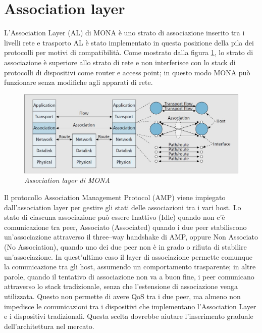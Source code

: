 \documentclass[12pt,a4paper,openright,twoside]{book}
\begin{document}
\section{Association layer}

L'Association Layer (AL) di MONA è uno strato di associazione inserito
tra i livelli rete e trasporto AL è stato implementato in questa
posizione della pila dei protocolli per motivi di compatibilità. Come
mostrato dalla figura \ref{fig:mona-association-layer}, lo strato di
associazione è superiore allo strato di rete e non interferisce con lo
stack di protocolli di dispositivi come router e access point; in
questo modo MONA può funzionare senza modifiche agli apparati di rete.

\begin{figure}[tb]
\centering
\includegraphics[width=\textwidth]{img/mona-association-layer}
\caption{\em Association layer di MONA}
\label{fig:mona-association-layer}
\end{figure}

Il protocollo Association Management Protocol (AMP) viene impiegato
dall'association layer per gestire gli stati delle associazioni tra i
vari host. Lo stato di ciascuna associazione può essere Inattivo
(Idle) quando non c'è comunicazione tra peer, Associato (Associated)
quando i due peer stabiliscono un'associazione attraverso il
three--way handshake di AMP, oppure Non Associato (No Association),
quando uno dei due peer non è in grado o rifiuta di stabilire
un'associazione. In quest'ultimo caso il layer di associazione
permette comunque la comunicazione tra gli host, assumendo un
comportamento trasparente; in altre parole, quando il tentativo di
associazione non va a buon fine, i peer comunicano attraverso lo stack
tradizionale, senza che l'estensione di associazione venga
utilizzata. Questo non permette di avere QoS tra i due peer, ma almeno
non impedisce le comunicazioni tra i dispositivi che implementano
l'Association Layer e i dispositivi tradizionali. Questa scelta
dovrebbe aiutare l'inserimento graduale dell'architettura nel mercato.
\end{document}
